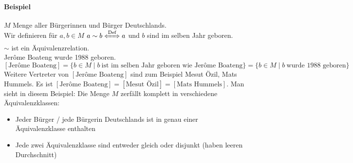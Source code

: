 \documentclass[a4paper]{scrartcl}
\theoremstyle{definition}
\theoremstyle{plain}
\theoremstyle{plain}
\theoremstyle{remark}
\theoremstyle{remark}
\theoremstyle{remark}
\theoremstyle{remark}
\theoremstyle{remark}
\begin{document}
\paragraph{Beispiel}
\label{sec-2-5-6-1}
$M$ Menge aller Bürgerinnen und Bürger Deutschlands. \\
         Wir definieren für $a,b\in M$ $a\sim b \xLeftrightarrow{\text{Def}} a$ und $b$ sind im selben Jahr geboren. \\
         $\sim$ ist ein Äquivalenzrelation. \\
         Jerôme Boateng wurde 1988 geboren. \\
         $[\text{Jerôme Boateng}] = \{b\in M\mid b~\text{ist im selben Jahr geboren wie Jerôme Boateng}\} = \{b\in M\mid b~\text{wurde 1988 geboren}\}$
Weitere Vertreter von $[\text{Jerôme Boateng}]$ sind zum Beispiel Mesut Özil, Mats Hummels.
Es ist $[\text{Jerôme Boateng}] = [\text{Mesut Özil}] = [\text{Mats Hummels}]$.
Man sieht in diesem Beispiel: Die Menge $M$ zerfällt komplett in verschiedene Äquivalenzklassen:
\begin{itemize}
\item Jeder Bürger / jede Bürgerin Deutschlands ist in genau einer Äquivalenzklasse enthalten
\item Jede zwei Äquivalenzklasse sind entweder gleich oder disjunkt (haben leeren Durchschnitt)
\end{itemize}
\end{document}
